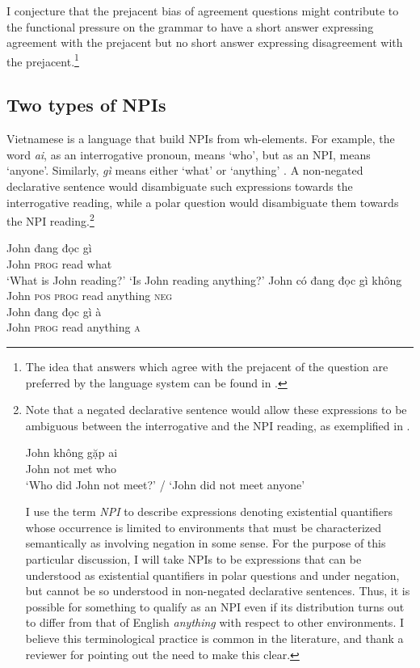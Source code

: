 \documentclass[output=paper,colorlinks,citecolor=brown]{langscibook}
\begin{document}
I conjecture that the prejacent bias of agreement questions might contribute to the functional pressure on the grammar to have a short answer expressing agreement with the prejacent but no short answer expressing disagreement with the prejacent.\footnote{The idea that answers which agree with the prejacent of the question are preferred by the language system can be found in \citet{roelofsen2015polarity}.} 


\subsection{Two types of NPIs \label{npi} }

Vietnamese is a language that build NPIs from wh-elements. For example, the word \textit{ai}, as an interrogative pronoun, means `who', but as an NPI, means `anyone'. Similarly, \textit{gì} means either `what' or `anything' \citep{Bruening:2006a}. A non-negated declarative sentence would disambiguate such expressions towards the interrogative reading, while a polar question would disambiguate them towards the NPI reading.\footnote{Note that a negated declarative sentence would allow these expressions to be ambiguous between the interrogative and the NPI reading, as exemplified in .

\ea \label{jkga}
\gll John không gặp ai\\
John not met who\\
\glt `Who did John not meet?' / `John did not meet anyone'
\z

I use the term \textit{NPI} to describe expressions denoting existential quantifiers whose occurrence is limited to environments that must be characterized semantically as involving negation in some sense. For the purpose of this particular discussion, I will take NPIs to be expressions that can be understood as existential quantifiers in polar questions and under negation, but cannot be so understood in non-negated declarative sentences. Thus, it is possible for something to qualify as an NPI even if its distribution turns out to differ from that of English \textit{anything} with respect to other environments. I believe this terminological practice is common in the literature, and thank a reviewer for pointing out the need to make this clear.}

\ea
\ea
\gll John đang đọc gì\\
John \textsc{prog} read what\\
\glt `What is John reading?'
\ex `Is John reading anything?'
\ea
\gll John có đang đọc gì không\\
John \textsc{pos} \textsc{prog} read anything \textsc{neg}\\
\ex
\gll John đang đọc gì à\\
John \textsc{prog} read anything \textsc{a}\\
\z
\z
\z
\end{document}
